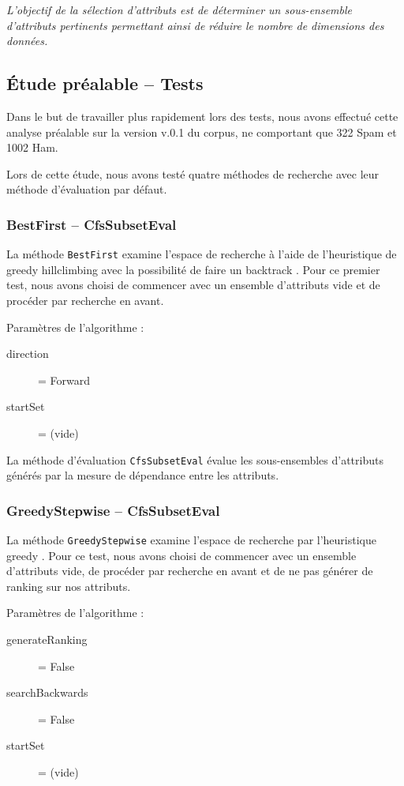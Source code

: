 \label{partieA3}
\textit{L'objectif de la sélection d'attributs est de déterminer un sous-ensemble d'attributs pertinents permettant ainsi de réduire le nombre de dimensions des données.}

\subsection{Étude préalable -- Tests}

Dans le but de travailler plus rapidement lors des tests, nous avons effectué cette analyse préalable sur la version v.0.1 du corpus, ne comportant que 322 Spam et 1002 Ham.

Lors de cette étude, nous avons testé quatre méthodes de recherche avec leur méthode d'évaluation par défaut.

\subsubsection{BestFirst -- CfsSubsetEval}

La méthode \texttt{BestFirst} examine l'espace de recherche à l'aide de l'heuristique de \og greedy hillclimbing \fg{} avec la possibilité de faire un  \og backtrack \fg{}.  Pour ce premier test, nous avons choisi de commencer avec un ensemble d'attributs vide et de procéder par recherche en avant.

Paramètres de l'algorithme : 
\begin{description}
	\item[direction] = Forward
	\item[startSet] = (vide)
\end{description}

La méthode d'évaluation \texttt{CfsSubsetEval} évalue les sous-ensembles d'attributs générés par la mesure de dépendance entre les attributs.

\subsubsection{GreedyStepwise -- CfsSubsetEval}

La méthode \texttt{GreedyStepwise} examine l'espace de recherche par l'heuristique \og greedy \fg{}. Pour ce test, nous avons choisi de commencer avec un ensemble d'attributs vide, de procéder par recherche en avant et de ne pas générer de \og ranking \fg{} sur nos attributs.

Paramètres de l'algorithme :
\begin{description}
	\item[generateRanking] = False
	\item[searchBackwards] = False
	\item[startSet] = (vide)
\end{description}

